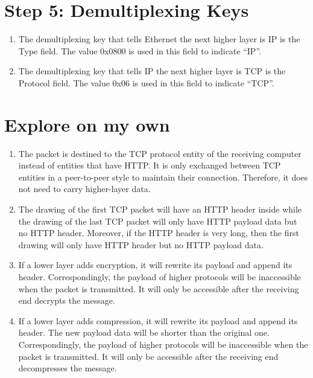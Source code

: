 \documentclass[a4paper]{article}
\begin{document}
\section{Step 5: Demultiplexing Keys}
\begin{enumerate}
\item
The demultiplexing key that tells Ethernet the next higher layer is IP is the Type field. The value 0x0800 is used in this field to indicate “IP”.
\item
The demultiplexing key that tells IP the next higher layer is TCP is the Protocol field. The value 0x06 is used in this field to indicate “TCP”.
\end{enumerate}

\section{Explore on my own}
\begin{enumerate}
\item
The packet is destined to the TCP protocol entity of the receiving computer instead of entities that have HTTP. It is only exchanged between TCP entities in a peer-to-peer style to maintain their connection. Therefore, it does not need to carry higher-layer data.
\item
The drawing of the first TCP packet will have an HTTP header inside while the drawing of the last TCP packet will only have HTTP payload data but no HTTP header. Moreover, if the HTTP header is very long, then the first drawing will only have HTTP header but no HTTP payload data.
\item
If a lower layer adds encryption, it will rewrite its payload and append its header. Correspondingly, the payload of higher protocols will be inaccessible when the packet is transmitted. It will only be accessible after the receiving end decrypts the message.
\item
If a lower layer adds compression, it will rewrite its payload and append its header. The new payload data will be shorter than the original one. Correspondingly, the payload of higher protocols will be inaccessible when the packet is transmitted. It will only be accessible after the receiving end decompresses the message.
\end{enumerate}
\end{document}
